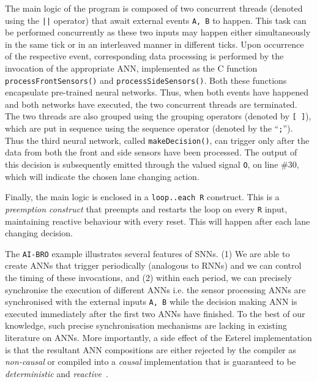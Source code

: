 The main logic of the program is composed of two concurrent threads (denoted using the \texttt{||} operator)
that await external events \texttt{A, B} to happen. 
This task can be performed concurrently as these two inputs may happen either simultaneously in the same tick or 
in an interleaved manner in different ticks. Upon occurrence of the respective event, corresponding data processing 
is performed by the invocation of the appropriate \ac{ANN}, implemented as the C function \texttt{processFrontSensors()}
and \texttt{processSideSensors()}. Both these functions encapsulate pre-trained neural networks. Thus, when both events have 
happened and both networks have executed, the two concurrent threads are terminated. The two threads are also grouped using the 
grouping operators (denoted by \texttt{[ ]}), which are put in sequence using the sequence operator (denoted by the ``\texttt;''). %
Thus the third neural network, called \texttt{makeDecision()},
can trigger only after the data from both the front and side sensors have been processed. 
The output of this decision is subsequently emitted through the valued signal \texttt{O}, on line \#30, which will indicate the chosen lane changing action.

Finally, the main logic is enclosed in a \texttt{loop..each R} construct. This is a \emph{preemption construct} that preempts and restarts the 
loop on every \texttt{R} input, maintaining reactive behaviour with every reset.
This will happen after each lane changing decision.


The \texttt{AI-BRO} example illustrates several features of \acp{SNN}. (1) We are able to create \acp{ANN} that trigger periodically (analogous
to \acp{RNN}) and we can control the timing of these invocations, and (2) within each period, we can precisely synchronise the 
execution of different \acp{ANN} i.e. the sensor processing \acp{ANN} are synchronised with the external inputs 
\texttt{A, B} while the decision making \ac{ANN} is executed immediately after the first two \acp{ANN} have finished. 
To the best of our knowledge, such precise synchronisation mechanisms are lacking in existing literature on \acp{ANN}.
More importantly, a side effect of the Esterel implementation is that the resultant \ac{ANN} compositions are 
either rejected by the compiler as \emph{non-causal} or compiled into a \emph{causal} implementation that is guaranteed to be
\emph{deterministic} and \emph{reactive}~\cite{benveniste2003synchronous}.


